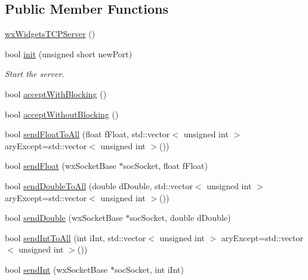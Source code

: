 \subsection*{Public Member Functions}
\begin{DoxyCompactItemize}
\item 
\hyperlink{class_rad_jav_1_1_networking_1_1wx_widgets_t_c_p_server_a38d5bf2fa8bc6efc916c4c1e1d8e871c}{wx\+Widgets\+T\+C\+P\+Server} ()
\item 
bool \hyperlink{class_rad_jav_1_1_networking_1_1wx_widgets_t_c_p_server_a81f49315ee1f742e4b3a580f817dc8a4}{init} (unsigned short new\+Port)
\begin{DoxyCompactList}\small\item\em Start the server. \end{DoxyCompactList}\item 
bool \hyperlink{class_rad_jav_1_1_networking_1_1wx_widgets_t_c_p_server_ad99ebe410a094937052c84ffec443fc4}{accept\+With\+Blocking} ()
\item 
bool \hyperlink{class_rad_jav_1_1_networking_1_1wx_widgets_t_c_p_server_ae71f7ff541da250f13b3fe477ebe3dc6}{accept\+Without\+Blocking} ()
\item 
bool \hyperlink{class_rad_jav_1_1_networking_1_1wx_widgets_t_c_p_server_ad4b1766a848c37097be7138ccd90655c}{send\+Float\+To\+All} (float f\+Float, std\+::vector$<$ unsigned int $>$ ary\+Except=std\+::vector$<$ unsigned int $>$())
\item 
bool \hyperlink{class_rad_jav_1_1_networking_1_1wx_widgets_t_c_p_server_a368e7c06011cefe233f4ccfaa3705631}{send\+Float} (wx\+Socket\+Base $\ast$soc\+Socket, float f\+Float)
\item 
bool \hyperlink{class_rad_jav_1_1_networking_1_1wx_widgets_t_c_p_server_a381da0804e225c057229850c34dcd980}{send\+Double\+To\+All} (double d\+Double, std\+::vector$<$ unsigned int $>$ ary\+Except=std\+::vector$<$ unsigned int $>$())
\item 
bool \hyperlink{class_rad_jav_1_1_networking_1_1wx_widgets_t_c_p_server_a95e6d71757d63373f57b4bd116369aee}{send\+Double} (wx\+Socket\+Base $\ast$soc\+Socket, double d\+Double)
\item 
bool \hyperlink{class_rad_jav_1_1_networking_1_1wx_widgets_t_c_p_server_a11077ed23889d905c130fc0026ba8c97}{send\+Int\+To\+All} (int i\+Int, std\+::vector$<$ unsigned int $>$ ary\+Except=std\+::vector$<$ unsigned int $>$())
\item 
bool \hyperlink{class_rad_jav_1_1_networking_1_1wx_widgets_t_c_p_server_a7e6918f5e463128a6c25a62487ba4430}{send\+Int} (wx\+Socket\+Base $\ast$soc\+Socket, int i\+Int)

\end{DoxyCompactItemize}
